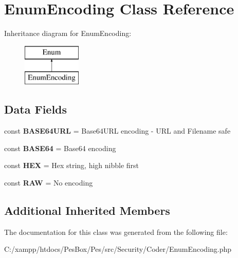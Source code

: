 \hypertarget{class_pes_1_1_security_1_1_coder_1_1_enum_encoding}{}\section{Enum\+Encoding Class Reference}
\label{class_pes_1_1_security_1_1_coder_1_1_enum_encoding}
Inheritance diagram for Enum\+Encoding\+:\begin{figure}[H]
\begin{center}
\leavevmode
\includegraphics[height=2.000000cm]{class_pes_1_1_security_1_1_coder_1_1_enum_encoding}
\end{center}
\end{figure}
\subsection*{Data Fields}
\begin{DoxyCompactItemize}
\item 
\mbox{\label{class_pes_1_1_security_1_1_coder_1_1_enum_encoding_a96cbc8f0edf400dbb5aeabf946470a8e}} 
const {\bfseries B\+A\+S\+E64\+U\+RL} = \textquotesingle{}Base64\+U\+RL encoding -\/ U\+RL and Filename safe\textquotesingle{}
\item 
\mbox{\label{class_pes_1_1_security_1_1_coder_1_1_enum_encoding_acbb7f2091442f552cb4ab5a2aedd0ddb}} 
const {\bfseries B\+A\+S\+E64} = \textquotesingle{}Base64 encoding\textquotesingle{}
\item 
\mbox{\label{class_pes_1_1_security_1_1_coder_1_1_enum_encoding_a84ecc3b07e7e9d57b63c5baf09da6985}} 
const {\bfseries H\+EX} = \textquotesingle{}Hex string, high nibble first\textquotesingle{}
\item 
\mbox{\label{class_pes_1_1_security_1_1_coder_1_1_enum_encoding_ac8b2ab99e4ae0ff97ec02ae3d5450741}} 
const {\bfseries R\+AW} = \textquotesingle{}No encoding\textquotesingle{}
\end{DoxyCompactItemize}
\subsection*{Additional Inherited Members}


The documentation for this class was generated from the following file\+:\begin{DoxyCompactItemize}
\item 
C\+:/xampp/htdocs/\+Pes\+Box/\+Pes/src/\+Security/\+Coder/Enum\+Encoding.\+php\end{DoxyCompactItemize}
